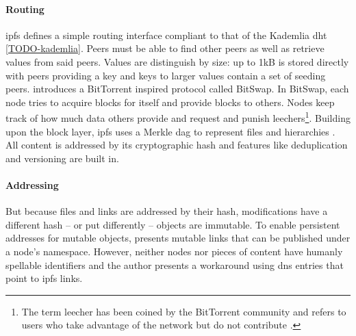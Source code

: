 \paragraph{Routing}
\gls{ipfs} defines a simple routing interface compliant to that of the Kademlia \gls{dht} \ref{TODO-kademlia}. Peers must be able to find other peers as well as retrieve values from said peers. Values are distinguish by size: up to 1kB is stored directly with peers providing a key and keys to larger values contain a set of seeding peers. \citet[\S3.5{ipfs-whitepaper} notes "different use cases will call for substantially different routing systems (e.g. DHT in wide network, static HT in local network)". To that end, the routing implementation should be exchangeable.

\paragraph{Data Distribution}
Files in \gls{ipfs} are defined made up of two abstraction layers. The lower layer consists of blocks of arbitrary binary data. \citet[\S3.4]{ipfs-whitepaper} introduces a BitTorrent inspired protocol called BitSwap. In BitSwap, each node tries to acquire blocks for itself and provide blocks to others. Nodes keep track of how much data others provide and request and punish leechers\footnote{The term leecher has been coined by the BitTorrent community and refers to users who take advantage of the network but do not contribute \cite[\S7.5]{tanenbaum_wetherall_2011}.}. Building upon the block layer, \gls{ipfs} uses a Merkle \gls{dag} to represent files and hierarchies \cite[\S3.5]{ipfs-whitepaper}. All content is addressed by its cryptographic hash \cite{content-centric-networking} and features like deduplication and versioning are built in.

\paragraph{Addressing}
But because files and links are addressed by their hash, modifications have a different hash – or put differently – objects are immutable. To enable persistent addresses for mutable objects, \citet[\S3.7]{ipfs-whitepaper} presents mutable links that can be published under a node's namespace. However, neither nodes nor pieces of content have humanly spellable identifiers and the author presents a workaround using \gls{dns} entries that point to \gls{ipfs} links.
